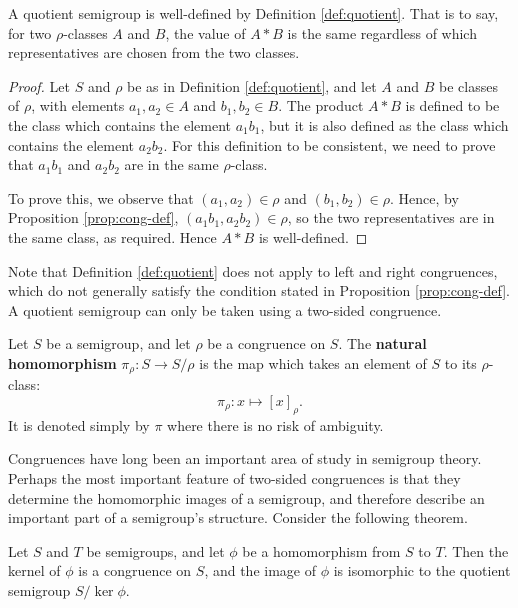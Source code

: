 \begin{proposition}
  \label{thm:quotient-well-defined}
  A quotient semigroup is well-defined by Definition \ref{def:quotient}.  That
  is to say, for two $\rho$-classes $A$ and $B$, the value of $A * B$ is the
  same regardless of which representatives are chosen from the two classes.
  \begin{proof}
    Let $S$ and $\rho$ be as in Definition \ref{def:quotient}, and let $A$ and
    $B$ be classes of $\rho$, with elements $a_1,a_2 \in A$ and $b_1,b_2 \in B$.
    The product $A*B$ is defined to be the class which contains the element
    $a_1b_1$, but it is also defined as the class which contains the element
    $a_2b_2$.  For this definition to be consistent, we need to prove that
    $a_1b_1$ and $a_2b_2$ are in the same $\rho$-class.

    To prove this, we observe that $(a_1,a_2) \in \rho$ and
    $(b_1,b_2) \in \rho$.  Hence, by Proposition \ref{prop:cong-def},
    $(a_1b_1, a_2b_2) \in \rho$, so the two representatives are in the same
    class, as required.  Hence $A * B$ is well-defined.
  \end{proof}
\end{proposition}


Note that Definition \ref{def:quotient} does not apply to left and right
congruences, which do not generally satisfy the condition stated in Proposition
\ref{prop:cong-def}.  A quotient semigroup can only be taken using a two-sided
congruence.

\begin{definition}
  \label{def:natural-homomorphism}
  Let $S$ be a semigroup, and let $\rho$ be a congruence on $S$.  The
  \textbf{natural homomorphism} $\pi_\rho: S \to S / \rho$ is the map which
  takes an element of $S$ to its $\rho$-class:
  $$\pi_\rho: x \mapsto [x]_\rho.$$
  It is denoted simply by $\pi$ where there is no risk of ambiguity.
\end{definition}

Congruences have long been an important area of study in semigroup theory.
Perhaps the most important feature of two-sided congruences is that they
determine the homomorphic images of a semigroup, and therefore describe an
important part of a semigroup's structure.  Consider the following theorem.

\begin{theorem}
  \label{thm:first-isomorphism}
  Let $S$ and $T$ be semigroups, and let $\phi$ be a homomorphism from $S$ to
  $T$.  Then the kernel of $\phi$ is a congruence on $S$, and the image of
  $\phi$ is isomorphic to the quotient semigroup $S / \ker{\phi}$.
\end{theorem}

